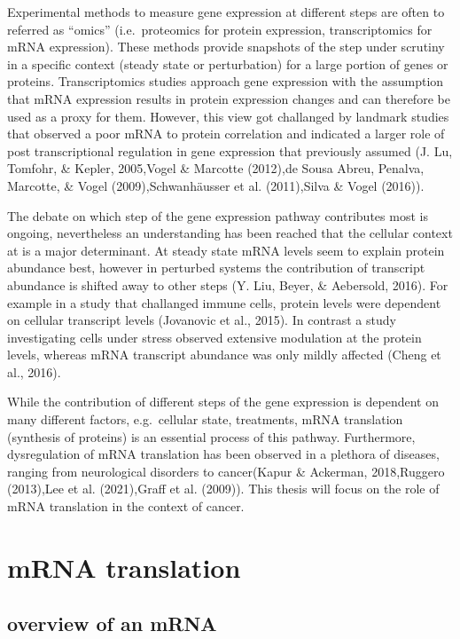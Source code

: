 \documentclass[12pt,openany]{book}
\begin{document}
Experimental methods to measure gene expression at different steps are
often to referred as ``omics'' (i.e.~proteomics for protein expression,
transcriptomics for mRNA expression). These methods provide snapshots of
the step under scrutiny in a specific context (steady state or
perturbation) for a large portion of genes or proteins. Transcriptomics
studies approach gene expression with the assumption that mRNA
expression results in protein expression changes and can therefore be
used as a proxy for them. However, this view got challanged by landmark
studies that observed a poor mRNA to protein correlation and indicated a
larger role of post transcriptional regulation in gene expression that
previously assumed (J. Lu, Tomfohr, \& Kepler, 2005,Vogel \& Marcotte
(2012),de Sousa Abreu, Penalva, Marcotte, \& Vogel (2009),Schwanhäusser
et al. (2011),Silva \& Vogel (2016)).

The debate on which step of the gene expression pathway contributes most
is ongoing, nevertheless an understanding has been reached that the
cellular context at is a major determinant. At steady state mRNA levels
seem to explain protein abundance best, however in perturbed systems the
contribution of transcript abundance is shifted away to other steps (Y.
Liu, Beyer, \& Aebersold, 2016). For example in a study that challanged
immune cells, protein levels were dependent on cellular transcript
levels (Jovanovic et al., 2015). In contrast a study investigating cells
under stress observed extensive modulation at the protein levels,
whereas mRNA transcript abundance was only mildly affected (Cheng et
al., 2016).

While the contribution of different steps of the gene expression is
dependent on many different factors, e.g.~cellular state, treatments,
mRNA translation (synthesis of proteins) is an essential process of this
pathway. Furthermore, dysregulation of mRNA translation has been
observed in a plethora of diseases, ranging from neurological disorders
to cancer(Kapur \& Ackerman, 2018,Ruggero (2013),Lee et al. (2021),Graff
et al. (2009)). This thesis will focus on the role of mRNA translation
in the context of cancer. \clearpage

\section{mRNA translation}\subsection{overview of an mRNA}
\end{document}
